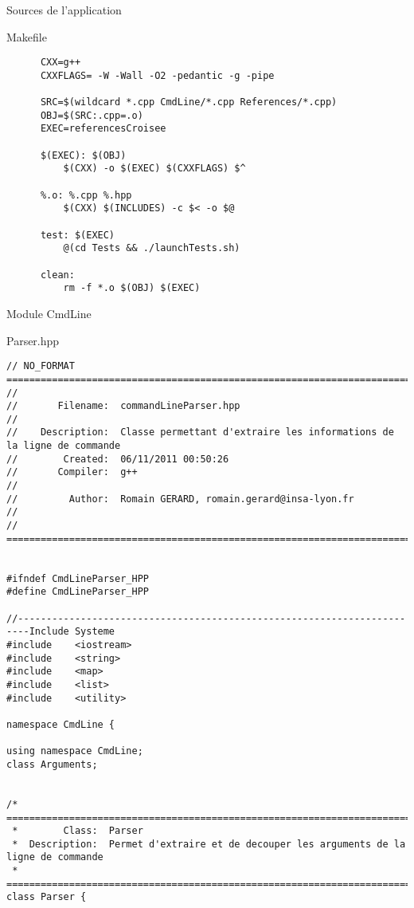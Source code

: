 \documentclass{article}
\begin{document}
\begin{section}{Sources de l'application}

\begin{subsection}{Makefile}
      \begin{verbatim}
      CXX=g++
      CXXFLAGS= -W -Wall -O2 -pedantic -g -pipe 

      SRC=$(wildcard *.cpp CmdLine/*.cpp References/*.cpp)
      OBJ=$(SRC:.cpp=.o)
      EXEC=referencesCroisee

      $(EXEC): $(OBJ)
	      $(CXX) -o $(EXEC) $(CXXFLAGS) $^ 

      %.o: %.cpp %.hpp
	      $(CXX) $(INCLUDES) -c $< -o $@

      test: $(EXEC) 
	      @(cd Tests && ./launchTests.sh)

      clean: 
	      rm -f *.o $(OBJ) $(EXEC)

      \end{verbatim}
\end{subsection}
\newpage


  \begin{subsection}{Module CmdLine}
  \begin{paragraph}{Parser.hpp}
      \begin{verbatim}
// NO_FORMAT ===========================================================================
//
//       Filename:  commandLineParser.hpp
//
//    Description:  Classe permettant d'extraire les informations de la ligne de commande
//        Created:  06/11/2011 00:50:26
//       Compiler:  g++
//
//         Author:  Romain GERARD, romain.gerard@insa-lyon.fr
//
// =====================================================================================


#ifndef CmdLineParser_HPP
#define CmdLineParser_HPP

//------------------------------------------------------------------------Include Systeme
#include    <iostream>
#include    <string>
#include    <map>
#include    <list>
#include    <utility>

namespace CmdLine {

using namespace CmdLine;
class Arguments;


/* =====================================================================================
 *        Class:  Parser
 *  Description:  Permet d'extraire et de decouper les arguments de la ligne de commande
 * =====================================================================================*/
class Parser {


\end{verbatim}
\end{paragraph}
\end{subsection}
\end{section}
\end{document}

